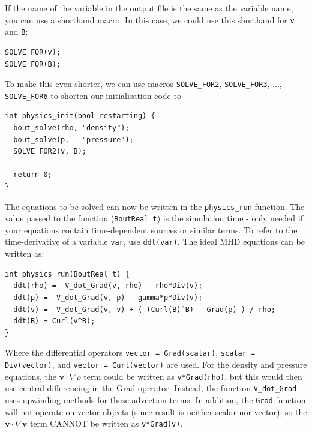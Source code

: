 \documentclass[12pt]{article}
\newcommand{\code}[1]{\texttt{#1}}
\begin{document}
If the name of the variable in the output file is the same as the variable
name, you can use a shorthand macro. In this case, we could use this shorthand
for \code{v} and \code{B}:
%
%
\begin{lstlisting}
SOLVE_FOR(v);
SOLVE_FOR(B);
\end{lstlisting}
%
To make this even shorter, we can use macros \code{SOLVE\_FOR2},
\code{SOLVE\_FOR3}, ..., \code{SOLVE\_FOR6} to shorten our initialisation code
to
%
\begin{lstlisting}
int physics_init(bool restarting) {
  bout_solve(rho, "density");
  bout_solve(p,   "pressure");
  SOLVE_FOR2(v, B);

  return 0;
}
\end{lstlisting}
%
The equations to be solved can now be written in the \code{physics\_run}
function. The value passed to the function (\code{BoutReal t}) is the
simulation time - only needed if your equations contain time-dependent sources
or similar terms. To refer to the time-derivative of a variable \code{var}, use
\code{ddt(var)}. The ideal MHD equations can be written as:
%
\begin{lstlisting}
int physics_run(BoutReal t) {
  ddt(rho) = -V_dot_Grad(v, rho) - rho*Div(v);
  ddt(p) = -V_dot_Grad(v, p) - gamma*p*Div(v);
  ddt(v) = -V_dot_Grad(v, v) + ( (Curl(B)^B) - Grad(p) ) / rho;
  ddt(B) = Curl(v^B);
}
\end{lstlisting}
%
Where the differential operators \code{vector = Grad(scalar)}, \code{scalar =
Div(vector)}, and \code{vector = Curl(vector)} are used. For the density and
pressure equations, the $\mathbf{v}\cdot\nabla\rho$ term could be written as
\code{v*Grad(rho)}, but this would then use central differencing in the Grad
operator. Instead, the function \code{V\_dot\_Grad} uses upwinding methods for
these advection terms. In addition, the \code{Grad} function will not operate
on vector objects (since result is neither scalar nor vector), so the
$\mathbf{v}\cdot\nabla\mathbf{v}$ term CANNOT be written as \code{v*Grad(v)}.
\end{document}
